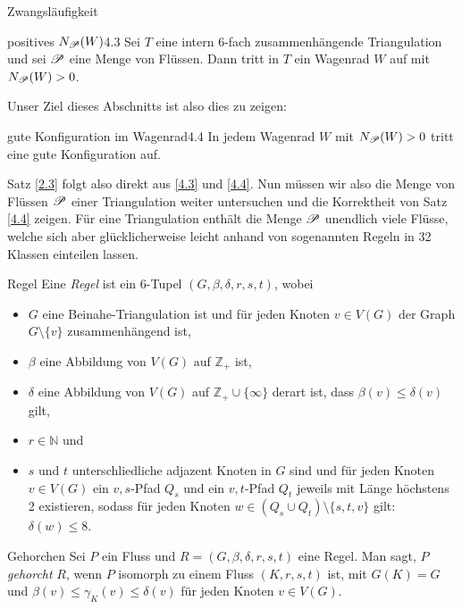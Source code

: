 \begin{section}{Zwangsläufigkeit}
 \begin{lemmal}{positives $N_{\mathscr{P}} (W)$}{4.3}
  Sei $T$ eine intern 6-fach zusammenhängende Triangulation und sei $\mathscr{P}$ eine Menge von Flüssen. Dann tritt in $T$ ein Wagenrad $W$ auf mit $N_{\mathscr{P}} (W) > 0$.
 \end{lemmal}
 
 Unser Ziel dieses Abschnitts ist also dies zu zeigen:
 
 \begin{satzl}{gute Konfiguration im Wagenrad}{4.4}
  In jedem Wagenrad $W$ mit $N_{\mathscr{P}} (W) > 0$ tritt eine gute Konfiguration auf.
 \end{satzl}
 
 Satz \ref{2.3} folgt also direkt aus \ref{4.3} und \ref{4.4}. Nun müssen wir also die Menge von Flüssen $\mathscr{P}$ einer Triangulation weiter untersuchen und die Korrektheit von Satz \ref{4.4} zeigen. Für eine Triangulation enthält die Menge $\mathscr{P}$ unendlich viele Flüsse, welche sich aber glücklicherweise leicht anhand von sogenannten Regeln in 32 Klassen einteilen lassen.
 
 \begin{definition}{Regel}
  Eine \textit{Regel} ist ein 6-Tupel $(G,\beta,\delta,r,s,t)$, wobei
  \begin{itemize}
   \item $G$ eine Beinahe-Triangulation ist und für jeden Knoten $v\in V(G)$ der Graph $G\setminus \{v\}$ zusammenhängend ist,
   \item $\beta$ eine Abbildung von $V(G)$ auf $\mathbb{Z}_+$ ist,
   \item $\delta$ eine Abbildung von $V(G)$ auf $\mathbb{Z}_+ \cup \{\infty\}$ derart ist, dass $\beta(v) \leq \delta(v)$ gilt, 
   \item $r \in \mathbb{N}$ und 
   \item $s$ und $t$ unterschliedliche adjazent Knoten in $G$ sind und für jeden Knoten $v\in V(G)$ ein $v,s$-Pfad $Q_s$ und ein $v,t$-Pfad $Q_t$ jeweils mit Länge höchstens 2 existieren, sodass für jeden Knoten $w \in (Q_s \cup Q_t)\setminus \{s,t,v\}$ gilt: $\delta(w) \leq 8$.
  \end{itemize}
 \end{definition}
 
 \begin{definition}{Gehorchen}
  Sei $P$ ein Fluss und $R=(G,\beta,\delta,r,s,t)$ eine Regel. Man sagt, $P$ \textit{gehorcht} $R$, wenn $P$ isomorph zu einem Fluss $(K,r,s,t)$ ist, mit $G(K) = G$ und $\beta(v) \leq \gamma_K(v) \leq \delta(v)$ für jeden Knoten $v \in V(G)$.
 \end{definition}
 

\end{section}
